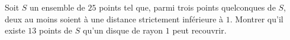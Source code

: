 Soit $S$ un ensemble de $25$ points tel que, parmi trois points quelconques de $S$, deux au moins soient à une distance strictement inférieure à $1$. Montrer qu'il existe $13$ points de $S$ qu'un disque de rayon $1$ peut recouvrir.
